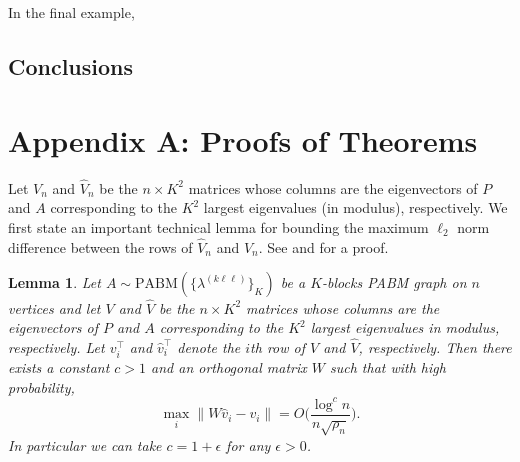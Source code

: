 \documentclass[
  11pt,
]{article}
\newtheorem{lemma}{Lemma}[section]
\theoremstyle{definition}
\theoremstyle{definition}
\theoremstyle{definition}
\theoremstyle{definition}
\theoremstyle{remark}
\begin{document}
In the final example,

\hypertarget{conclusions}{%
\subsection{Conclusions}\label{conclusions}}

\newpage

\section*{Appendix A: Proofs of Theorems}

Let \(V_n\) and \(\hat{V}_n\)
be the \(n \times K^2\) matrices whose columns are the eigenvectors of \(P\) and \(A\) corresponding to the
\(K^2\) largest eigenvalues (in modulus), respectively.
We first state an important technical lemma for bounding the maximum
\(\ell_2\) norm difference between the rows of \(\hat{V}_n\) and
\(V_n\). See \citet{cape_biometrika} and
\citet[Lemma~5]{rubindelanchy2017statistical} for a proof.

\begin{lemma}
\label{lem:technical}
Let $A \sim \mathrm{PABM}(\{\lambda^{(k \ell \ell)}\}_{K})$ be a $K$-blocks
PABM graph on $n$ vertices and let \(V\) and \(\hat{V}\)
be the $n \times K^2$ matrices whose columns are the eigenvectors of 
\(P\) and \(A\) corresponding to the
$K^2$ largest eigenvalues in modulus, respectively.
Let \(v_i^\top\) and \(\hat{v}_i^\top\) denote the $i$th 
row of \(V\) and \(\hat{V}\), respectively. 
Then there exists a constant $c > 1$ and an orthogonal matrix $W$ such
that with high probability,
$$\max_{i} \|W \hat{v}_i - v_i\|  = O\Big(\frac{\log^{c}n}{n \sqrt{\rho_n}} \Big).$$
In particular we can take $c = 1 + \epsilon$ for any $\epsilon > 0$. 
\end{lemma}
\end{document}
